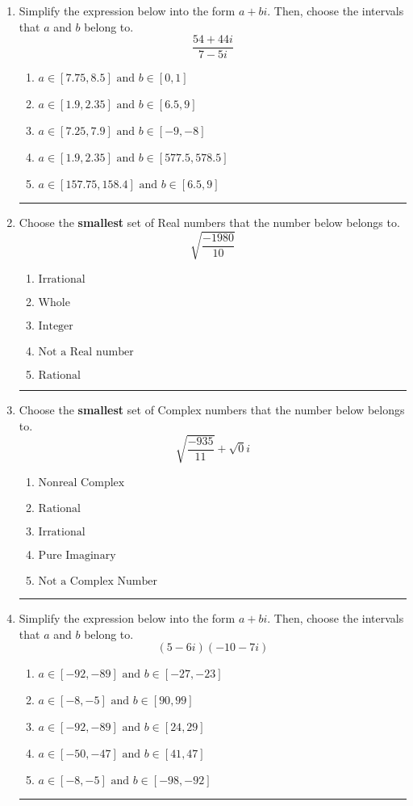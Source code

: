 \documentclass[14pt]{extbook}
\newcommand{\litem}[1]{\item#1\hspace*{-1cm}\rule{\textwidth}{0.4pt}}
\begin{document}
\begin{enumerate}
\litem{
Simplify the expression below into the form $a+bi$. Then, choose the intervals that $a$ and $b$ belong to.\[ \frac{54 + 44 i}{7 - 5 i} \]\begin{enumerate}[label=\Alph*.]
\item \( a \in [7.75, 8.5] \text{ and } b \in [0, 1] \)
\item \( a \in [1.9, 2.35] \text{ and } b \in [6.5, 9] \)
\item \( a \in [7.25, 7.9] \text{ and } b \in [-9, -8] \)
\item \( a \in [1.9, 2.35] \text{ and } b \in [577.5, 578.5] \)
\item \( a \in [157.75, 158.4] \text{ and } b \in [6.5, 9] \)

\end{enumerate} }
\litem{
Choose the \textbf{smallest} set of Real numbers that the number below belongs to.\[ \sqrt{\frac{-1980}{10}} \]\begin{enumerate}[label=\Alph*.]
\item \( \text{Irrational} \)
\item \( \text{Whole} \)
\item \( \text{Integer} \)
\item \( \text{Not a Real number} \)
\item \( \text{Rational} \)

\end{enumerate} }
\litem{
Choose the \textbf{smallest} set of Complex numbers that the number below belongs to.\[ \sqrt{\frac{-935}{11}}+\sqrt{0}i \]\begin{enumerate}[label=\Alph*.]
\item \( \text{Nonreal Complex} \)
\item \( \text{Rational} \)
\item \( \text{Irrational} \)
\item \( \text{Pure Imaginary} \)
\item \( \text{Not a Complex Number} \)

\end{enumerate} }
\litem{
Simplify the expression below into the form $a+bi$. Then, choose the intervals that $a$ and $b$ belong to.\[ (5 - 6 i)(-10 - 7 i) \]\begin{enumerate}[label=\Alph*.]
\item \( a \in [-92, -89] \text{ and } b \in [-27, -23] \)
\item \( a \in [-8, -5] \text{ and } b \in [90, 99] \)
\item \( a \in [-92, -89] \text{ and } b \in [24, 29] \)
\item \( a \in [-50, -47] \text{ and } b \in [41, 47] \)
\item \( a \in [-8, -5] \text{ and } b \in [-98, -92] \)


\end{enumerate}}
\end{enumerate}
\end{document}
